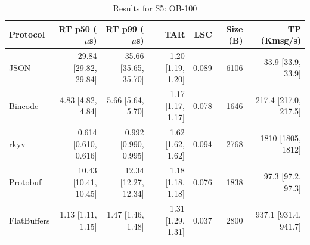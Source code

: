 \begin{table}[htbp]
\centering
\caption{Results for S5: OB-100}
\label{tab:results_book_large}
\begin{tabular}{l r r r r r r}
\hline
Protocol & RT p50 ($\mu$s) & RT p99 ($\mu$s) & TAR & LSC & Size (B) & TP (Kmsg/s) \\
\hline
  JSON & 29.84 [29.82, 29.84] & 35.66 [35.65, 35.70] & 1.20 [1.19, 1.20] & 0.089 & 6106 & 33.9 [33.9, 33.9] \\
  Bincode & 4.83 [4.82, 4.84] & 5.66 [5.64, 5.70] & 1.17 [1.17, 1.17] & 0.078 & 1646 & 217.4 [217.0, 217.5] \\
  rkyv & 0.614 [0.610, 0.616] & 0.992 [0.990, 0.995] & 1.62 [1.62, 1.62] & 0.094 & 2768 & 1810 [1805, 1812] \\
  Protobuf & 10.43 [10.41, 10.45] & 12.34 [12.27, 12.34] & 1.18 [1.18, 1.18] & 0.076 & 1838 & 97.3 [97.2, 97.3] \\
  FlatBuffers & 1.13 [1.11, 1.15] & 1.47 [1.46, 1.48] & 1.31 [1.29, 1.31] & 0.037 & 2800 & 937.1 [931.4, 941.7] \\
\hline
\end{tabular}
\end{table}
